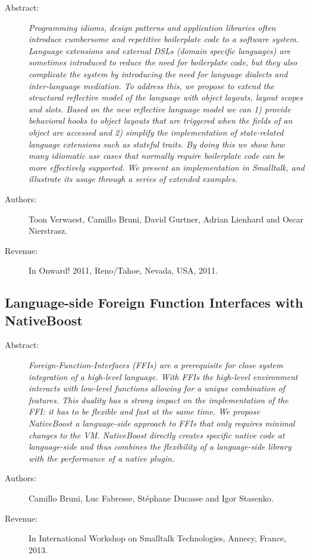 \begin{description}
	\item[Abstract:] \emph{
Programming idioms, design patterns and application libraries often introduce cumbersome and repetitive boilerplate code to a software system.
Language extensions and external {DSLs} (domain specific languages) are sometimes introduced to reduce the need for boilerplate code, but they also complicate the system by introducing the need for language dialects and inter-language mediation.
To address this, we propose to extend the structural reflective model of the language with object layouts, layout scopes and slots.
Based on the new reflective language model we can 1) provide behavioral hooks to object layouts that are triggered when the fields of an object are accessed and 2) simplify the implementation of state-related language extensions such as stateful traits.
By doing this we show how many idiomatic use cases that normally require boilerplate code can be more effectively supported.
We present an implementation in Smalltalk, and illustrate its usage through a series of extended examples.}

	\item[Authors:] Toon Verwaest, Camillo Bruni, David Gurtner, Adrian Lienhard and Oscar Nierstrasz. 
	\item[Revenue:] In Onward! 2011, Reno/Tahoe, Nevada, USA, 2011.
\end{description}

\subsection{Language-side Foreign Function Interfaces with NativeBoost}

\begin{description}
	\item[Abstract:] \emph{
Foreign-Function-Interfaces (FFIs) are a prerequisite for close system integration of a high-level language.
With FFIs the high-level environment interacts with low-level functions allowing for a unique combination of features.
This duality has a strong impact on the implementation of the FFI: it has to be flexible and fast at the same time.
We propose NativeBoost a language-side approach to FFIs that only requires minimal changes to the VM.
NativeBoost directly creates specific native code at language-side and thus combines the flexibility of a language-side library with the performance of a native plugin.}

	\item[Authors:]  Camillo Bruni, Luc Fabresse, Stéphane Ducasse and Igor Stasenko. 
	\item[Revenue:] In International Workshop on Smalltalk Technologies, Annecy, France, 2013.
\end{description}


